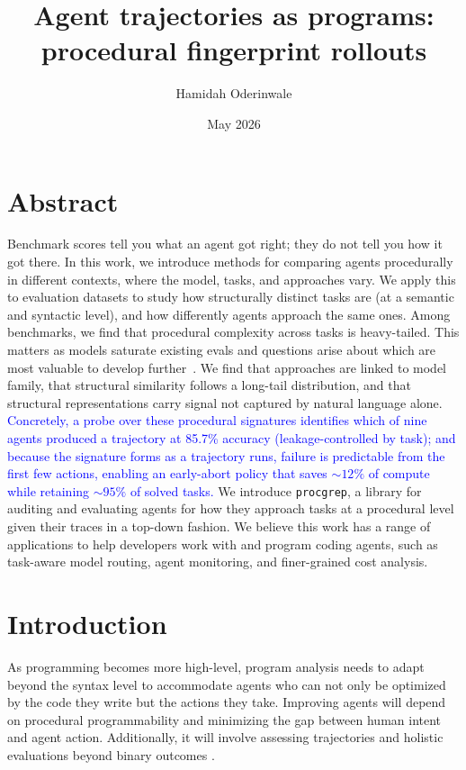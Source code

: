 \documentclass[12pt]{article}
\title{Agent trajectories as programs: procedural fingerprint rollouts}
\author{Hamidah Oderinwale}
\date{May 2026}
\begin{document}
\maketitle

\section{Abstract}
Benchmark scores tell you what an agent got right; they do not tell you how it got there. In this work, we introduce methods for comparing agents procedurally in different contexts, where the model, tasks, and approaches vary. We apply this to evaluation datasets to study how structurally distinct tasks are (at a semantic and syntactic level), and how differently agents approach the same ones. Among benchmarks, we find that procedural complexity across tasks is heavy-tailed. This matters as models saturate existing evals and questions arise about which are most valuable to develop further~\cite{kiela-etal-2021-dynabench}. We find that approaches are linked to model family, that structural similarity follows a long-tail distribution, and that structural representations carry signal not captured by natural language alone. \textcolor{blue}{Concretely, a probe over these procedural signatures identifies which of nine agents produced a trajectory at 85.7\% accuracy (leakage-controlled by task); and because the signature forms as a trajectory runs, failure is predictable from the first few actions, enabling an early-abort policy that saves ${\sim}12\%$ of compute while retaining ${\sim}95\%$ of solved tasks.} We introduce \texttt{procgrep}, a library for auditing and evaluating agents for how they approach tasks at a procedural level given their traces in a top-down fashion. We believe this work has a range of applications to help developers work with and program coding agents, such as task-aware model routing, agent monitoring, and finer-grained cost analysis.

\section{Introduction}
As programming becomes more high-level, program analysis needs to adapt beyond the syntax level to accommodate agents who can not only be optimized by the code they write but the actions they take. Improving agents will depend on procedural programmability and minimizing the gap between human intent and agent action. Additionally, it will involve assessing trajectories and holistic evaluations beyond binary outcomes \cite{haupt2025position}.
\end{document}
